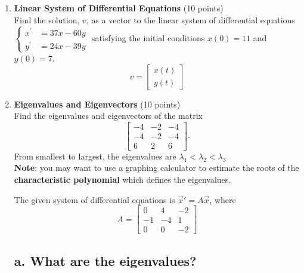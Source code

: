 \begin{enumerate}
  \newpage

  \item \textbf{Linear System of Differential Equations} (10 points)\\
  Find the solution, $v$, as a vector to the linear system of differential equations 
  $\left\{\begin{array}{ll}x^{\prime} & =37 x-60 y \\ y^{\prime} & =24 x-39 y\end{array}\right.$ 
  satisfying the initial conditions $x(0)=11$ and $y(0)=7$.
  $$v=\left[\begin{array}{l}
    x(t) \\
    y(t) 
  \end{array}\right]
  $$
  \begin{subanswer}
  \end{subanswer}

  \item \textbf{Eigenvalues and Eigenvectors} (10 points)\\
  Find the eigenvalues and eigenvectors of the matrix
  $$
  \left[\begin{array}{ccc}
  -4 & -2 & -4 \\
  -4 & -2 & -4 \\
  6 & 2 & 6
  \end{array}\right] .
  $$
  From smallest to largest, the eigenvalues are $\lambda_1<\lambda_2<\lambda_3$\\
  \textbf{Note}: you may want to use a graphing calculator to estimate the roots of 
  the \textbf{characteristic polynomial} which defines the eigenvalues.
  \begin{subanswer}
  \end{subanswer}


  \newpage

  The given system of differential equations is $\vec{x}' = A\vec{x}$, where 
  \[
  A = \begin{bmatrix} 
  0 & 4 & -2 \\ 
  -1 & -4 & 1 \\ 
  0 & 0 & -2 
  \end{bmatrix}
  \]

  \subsection*{a. What are the eigenvalues?}


\end{enumerate}
